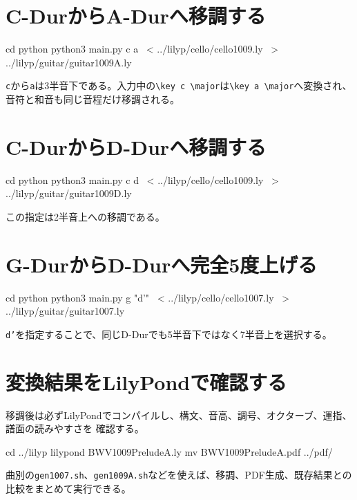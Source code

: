 \documentclass[uplatex,a4paper,11pt]{jsbook}
\begin{document}
\section{C-DurからA-Durへ移調する}

\begin{command}
cd python
python3 main.py c a \
  < ../lilyp/cello/cello1009.ly \
  > ../lilyp/guitar/guitar1009A.ly
\end{command}

\texttt{c}から\texttt{a}は3半音下である。入力中の\texttt{\textbackslash key c
\textbackslash major}は\texttt{\textbackslash key a \textbackslash major}へ変換され、
音符と和音も同じ音程だけ移調される。

\section{C-DurからD-Durへ移調する}

\begin{command}
cd python
python3 main.py c d \
  < ../lilyp/cello/cello1009.ly \
  > ../lilyp/guitar/guitar1009D.ly
\end{command}

この指定は2半音上への移調である。

\section{G-DurからD-Durへ完全5度上げる}

\begin{command}
cd python
python3 main.py g "d'" \
  < ../lilyp/cello/cello1007.ly \
  > ../lilyp/guitar/guitar1007.ly
\end{command}

\texttt{d'}を指定することで、同じD-Durでも5半音下ではなく7半音上を選択する。

\section{変換結果をLilyPondで確認する}

移調後は必ずLilyPondでコンパイルし、構文、音高、調号、オクターブ、運指、譜面の読みやすさを
確認する。

\begin{command}
cd ../lilyp
lilypond BWV1009PreludeA.ly
mv BWV1009PreludeA.pdf ../pdf/
\end{command}

曲別の\texttt{gen1007.sh}、\texttt{gen1009A.sh}などを使えば、移調、PDF生成、既存結果との
比較をまとめて実行できる。
\end{document}
